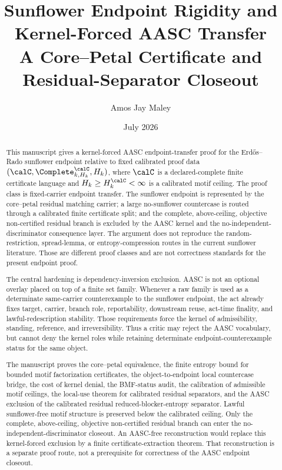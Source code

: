 \documentclass[11pt]{article}
\title{Sunflower Endpoint Rigidity and Kernel-Forced AASC Transfer\\
\large A Core--Petal Certificate and Residual-Separator Closeout}
\author{Amos Jay Maley}
\date{July 2026}
\begin{document}
\maketitle

\begin{abstract}
This manuscript gives a kernel-forced AASC endpoint-transfer proof for the Erdős--Rado sunflower endpoint relative to fixed calibrated proof data \((\calC,\Complete^{\calC}_{k,H_k},H_k)\), where \(\calC\) is a declared-complete finite certificate language and \(H_k\ge H_k^{\calC}<\infty\) is a calibrated motif ceiling. The proof class is fixed-carrier endpoint transfer. The sunflower endpoint is represented by the core--petal residual matching carrier; a large no-sunflower countercase is routed through a calibrated finite certificate split; and the complete, above-ceiling, objective non-certified residual branch is excluded by the AASC kernel and the no-independent-discriminator consequence layer. The argument does not reproduce the random-restriction, spread-lemma, or entropy-compression routes in the current sunflower literature. Those are different proof classes and are not correctness standards for the present endpoint proof.

The central hardening is dependency-inversion exclusion. AASC is not an optional overlay placed on top of a finite set family. Whenever a raw family is used as a determinate same-carrier counterexample to the sunflower endpoint, the act already fixes target, carrier, branch role, reportability, downstream reuse, act-time finality, and lawful-redescription stability. Those requirements force the kernel of admissibility, standing, reference, and irreversibility. Thus a critic may reject the AASC vocabulary, but cannot deny the kernel roles while retaining determinate endpoint-counterexample status for the same object.

The manuscript proves the core--petal equivalence, the finite entropy bound for bounded motif factorization certificates, the object-to-endpoint local countercase bridge, the cost of kernel denial, the BMF-status audit, the calibration of admissible motif ceilings, the local-use theorem for calibrated residual separators, and the AASC exclusion of the calibrated residual reduced-blocker-entropy separator. Lawful sunflower-free motif structure is preserved below the calibrated ceiling. Only the complete, above-ceiling, objective non-certified residual branch can enter the no-independent-discriminator closeout. An AASC-free reconstruction would replace this kernel-forced exclusion by a finite certificate-extraction theorem. That reconstruction is a separate proof route, not a prerequisite for correctness of the AASC endpoint closeout.
\end{abstract}
\end{document}
